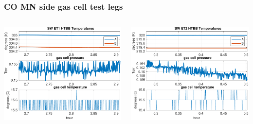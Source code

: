\documentclass[9pt]{beamer}
\begin{document}
\begin{frame}
\frametitle{CO MN side gas cell test legs}

\begin{columns}[t]
\begin{column}{0.45\textwidth}
  \begin{centering}
  \includegraphics[width=\textwidth]{harvest_02-11/02-12_SW_ET1.pdf}
  \end{centering}
\end{column}
\begin{column}{0.45\textwidth}  
  \begin{centering}
  \includegraphics[width=\textwidth]{harvest_02-11/02-12_SW_ET2.pdf}
  \end{centering}
\end{column}
\end{columns}
\vspace{3mm}


\end{frame}
\end{document}

